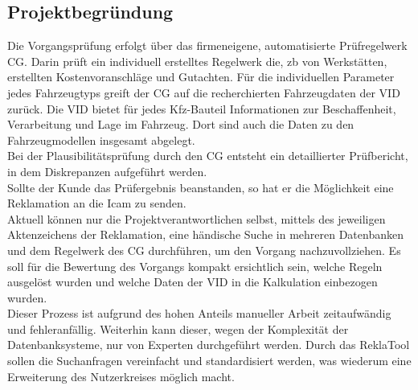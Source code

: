 \subsection{Projektbegründung} 
\label{sec:Projektbegruendung}
Die Vorgangsprüfung erfolgt über das firmeneigene, automatisierte Prüfregelwerk \ac{CG}.
Darin prüft ein individuell erstelltes Regelwerk die, \acs{zb} von Werkstätten, erstellten
Kostenvoranschläge und Gutachten. Für die individuellen Parameter jedes Fahrzeugtyps greift
der \acs{CG} auf die recherchierten Fahrzeugdaten der \ac{VID} zurück. 
Die \acs{VID} bietet für jedes Kfz-Bauteil Informationen zur Beschaffenheit, Verarbeitung und Lage im Fahrzeug.
Dort sind auch die Daten zu den Fahrzeugmodellen insgesamt abgelegt.\\
Bei der Plausibilitätsprüfung durch den \acs{CG} entsteht ein detaillierter Prüfbericht, in dem 
Diskrepanzen aufgeführt werden.\\
Sollte der Kunde das Prüfergebnis beanstanden, so hat er die Möglichkeit eine Reklamation an
die \acs{Icam} zu senden.\\
Aktuell können nur die Projektverantwortlichen selbst, mittels des jeweiligen Aktenzeichens der
Reklamation, eine händische Suche in mehreren Datenbanken und dem Regelwerk des \acs{CG}
durchführen, um den Vorgang nachzuvollziehen. Es soll für die Bewertung des Vorgangs kompakt
ersichtlich sein, welche Regeln ausgelöst wurden und welche Daten der \acs{VID} in die Kalkulation 
einbezogen wurden.\\
Dieser Prozess ist aufgrund des hohen Anteils manueller Arbeit zeitaufwändig und fehleranfällig.
Weiterhin kann dieser, wegen der Komplexität der Datenbanksysteme, nur von Experten durchgeführt werden.
Durch das ReklaTool sollen die Suchanfragen vereinfacht und standardisiert werden, was wiederum 
eine Erweiterung des Nutzerkreises möglich macht.

